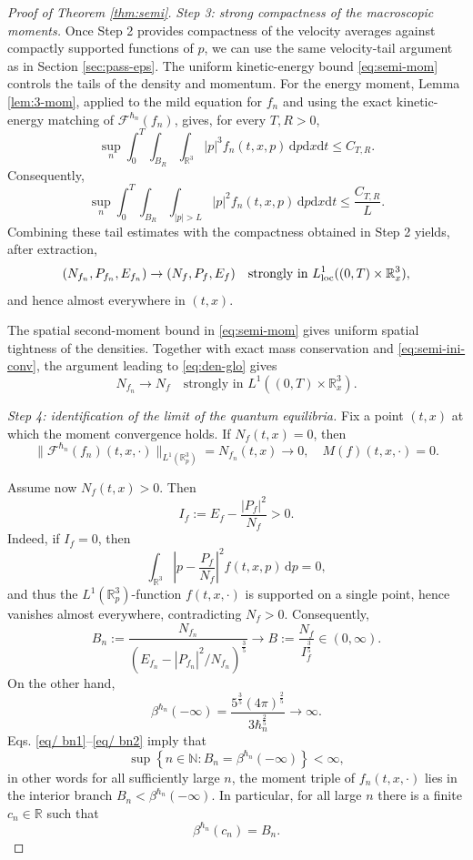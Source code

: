 \documentclass[10pt,reqno]{amsart}
\numberwithin{equation}{section}
\theoremstyle{definition}
\newcommand{\R}{\mathbb R}
\newcommand{\dx}{\mathrm{d}x}
\newcommand{\dpp}{\mathrm{d}p}
\newcommand{\dt}{\mathrm{d}t}
\newcommand{\calF}{\mathcal F}
\newcommand{\bq}{\begin{equation}}
\newcommand{\eq}{\end{equation}}
\newcommand{\lt}{\left}
\newcommand{\rt}{\right}
\begin{document}
\begin{proof}[Proof of Theorem \ref{thm:semi}]
\emph{Step 3: strong compactness of the macroscopic moments.}
Once Step 2 provides compactness of the velocity averages against compactly supported functions of $p$, we can use the same velocity-tail argument as in Section \ref{sec:pass-eps}.  The uniform kinetic-energy bound \eqref{eq:semi-mom} controls the tails of the density and momentum.  For the energy moment, Lemma \ref{lem:3-mom}, applied to the mild equation for $f_n$ and using the exact kinetic-energy matching of $\calF^{\hbar_n}(f_n)$, gives, for every $T,R>0$,
\[
 \sup_n  \int_0^T\int_{B_R}\int_{\R^3}  |p|^3f_n(t,x,p)\,\dpp\dx\dt  \leq C_{T,R}.
\]
Consequently,
\[
 \sup_n  \int_0^T\int_{B_R}\int_{|p|>L}  |p|^2f_n(t,x,p)\,\dpp\dx\dt  \leq\frac{C_{T,R}}{L}.
\]
Combining these tail estimates with the compactness obtained in Step 2 yields, after extraction,
\[
 (N_{f_n},P_{f_n},E_{f_n})  \to  (N_f,P_f,E_f)  \quad\text{strongly in }  L^1_{\rm loc}((0,T)\times\R^3_x),
\]
and hence almost everywhere in $(t,x)$.

The spatial second-moment bound in \eqref{eq:semi-mom} gives uniform spatial tightness of the densities.  Together with exact mass conservation and \eqref{eq:semi-ini-conv}, the argument leading to \eqref{eq:den-glo} gives
\bq \label{eq:semi-den-glo}
 N_{f_n}\to N_f
 \quad\text{strongly in }L^1((0,T)\times\R^3_x).
\eq
 
\emph{Step 4: identification of the limit of the  quantum equilibria.}
Fix a point $(t,x)$ at which the moment convergence holds.  If $N_f(t,x)=0$, then
\[
 \|\calF^{\hbar_n}(f_n)(t,x,\cdot)\|_{L^1(\R^3_p)}  =N_{f_n}(t,x)\to0,  \quad M(f)(t,x,\cdot)=0.
\]

Assume now $N_f(t,x)>0$.  Then
\[
 I_f:=E_f-\frac{|P_f|^2}{N_f}>0.
\]
Indeed, if $I_f=0$, then
\[
 \int_{\R^3}\lt|p-\frac{P_f}{N_f}\rt|^2f(t,x,p)\,\dpp=0,
\]
and thus the $L^1(\R^3_p)$-function $f(t,x,\cdot)$ is supported on a single point, hence vanishes almost everywhere, contradicting $N_f>0$.
Consequently,
\begin{equation} \label{eq/ bn1}
 B_n:=\frac{N_{f_n}}{(E_{f_n}-|P_{f_n}|^2/N_{f_n})^{\frac35}}  \to  B:=\frac{N_f}{I_f^{\frac35}}\in(0,\infty).
\end{equation}
On the other hand,
\begin{equation}\label{eq/ bn2}
 \beta^{\hbar_n}(-\infty) = \frac{5^{\frac35}(4\pi)^{\frac25}}{3\hbar_n^{\frac25}}  \to\infty.
\end{equation}
Eqs. \eqref{eq/ bn1}--\eqref{eq/ bn2} imply that
\begin{equation*}
    \sup \lt\{ n\in \mathbb{N} : B_n = \beta^{\hbar_n}(-\infty) \rt\}  < \infty,
\end{equation*} 
in other words for all sufficiently large $n$, the moment triple of $f_n(t,x,\cdot)$ lies in the interior branch $B_n<\beta^{\hbar_n}(-\infty)$. In
particular, for all large $n$ there is a finite $c_n\in \R$ such that
\[
 \beta^{\hbar_n}(c_n)=B_n.
\]


\end{proof}
\end{document}
